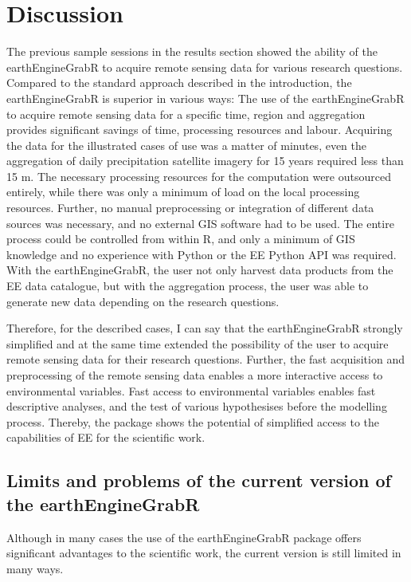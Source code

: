 \chapter{Discussion}


The previous sample sessions in the results section showed the ability of the earthEngineGrabR to acquire remote sensing data for various research questions.
Compared to the standard approach described in the introduction, the earthEngineGrabR is superior in various ways:
The use of the earthEngineGrabR to acquire remote sensing data for a specific time, region and aggregation provides significant savings of time, processing resources and labour. Acquiring the data for the illustrated cases of use was a matter of minutes, even the aggregation of daily precipitation satellite imagery for 15 years required less than 15 m. The necessary processing resources for the computation were outsourced entirely, while there was only a minimum of load on the local processing resources. Further, no manual preprocessing or integration of different data sources was necessary, and no external GIS software had to be used. The entire process could be controlled from within R, and only a minimum of GIS knowledge and no experience with Python or the EE Python API was required. With the earthEngineGrabR, the user not only harvest data products from the EE data catalogue, but with the aggregation process, the user was able to  generate new data depending on the research questions. 

Therefore, for the described cases, I can say that the earthEngineGrabR strongly simplified and at the same time extended the possibility of the user to acquire remote sensing data for their research questions. Further, the fast acquisition and preprocessing of the remote sensing data enables a more interactive access to environmental variables.
Fast access to environmental variables enables fast descriptive analyses, and the test of various hypothesises before the modelling process.
Thereby, the package shows the potential of simplified access to the capabilities of EE for the scientific work.


\section{Limits and problems of the current version of the earthEngineGrabR}

Although in many cases the use of the earthEngineGrabR package offers significant advantages to the scientific work, the current version is still limited in many ways. 

